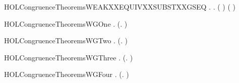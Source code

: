 \newcommand{\HOLCongruenceTheoremsWEAKXXEQUIVXXSUBSTXXGCONTEXT}{\UseVerbatim{HOLCongruenceTheoremsWEAKXXEQUIVXXSUBSTXXGCONTEXT}}
\begin{SaveVerbatim}{HOLCongruenceTheoremsWEAKXXEQUIVXXSUBSTXXGSEQ}
\HOLTokenTurnstile{} \HOLSymConst{\HOLTokenForall{}} .    \HOLSymConst{\HOLTokenImp{}} \HOLSymConst{\HOLTokenForall{}}.   \HOLSymConst{\HOLTokenImp{}}  ( ) ( )
\end{SaveVerbatim}
\newcommand{\HOLCongruenceTheoremsWEAKXXEQUIVXXSUBSTXXGSEQ}{\UseVerbatim{HOLCongruenceTheoremsWEAKXXEQUIVXXSUBSTXXGSEQ}}
\begin{SaveVerbatim}{HOLCongruenceTheoremsWGOne}
\HOLTokenTurnstile{} \HOLSymConst{\HOLTokenForall{}}.  (\HOLTokenLambda{}. )
\end{SaveVerbatim}
\newcommand{\HOLCongruenceTheoremsWGOne}{\UseVerbatim{HOLCongruenceTheoremsWGOne}}
\begin{SaveVerbatim}{HOLCongruenceTheoremsWGTwo}
\HOLTokenTurnstile{} \HOLSymConst{\HOLTokenForall{}}.  (\HOLTokenLambda{}. )
\end{SaveVerbatim}
\newcommand{\HOLCongruenceTheoremsWGTwo}{\UseVerbatim{HOLCongruenceTheoremsWGTwo}}
\begin{SaveVerbatim}{HOLCongruenceTheoremsWGThree}
\HOLTokenTurnstile{} \HOLSymConst{\HOLTokenForall{}} .   \HOLSymConst{\HOLTokenImp{}}  (\HOLTokenLambda{}.  )
\end{SaveVerbatim}
\newcommand{\HOLCongruenceTheoremsWGThree}{\UseVerbatim{HOLCongruenceTheoremsWGThree}}
\begin{SaveVerbatim}{HOLCongruenceTheoremsWGFour}
\HOLTokenTurnstile{} \HOLSymConst{\HOLTokenForall{}} .   \HOLSymConst{\HOLTokenConj{}}   \HOLSymConst{\HOLTokenImp{}}  (\HOLTokenLambda{}.   \HOLSymConst{+}  )
\end{SaveVerbatim}
